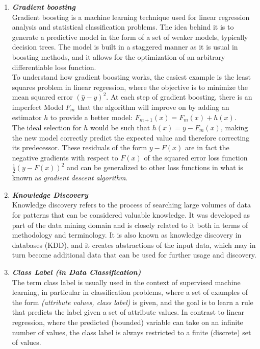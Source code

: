 \documentclass{article}
\begin{document}
\begin{enumerate}[label=(\alph*)]
\begin{enumerate}[label=\textbf{\arabic*.}]
            \item \textbf{\textit{Gradient boosting}}\\
Gradient boosting is a machine learning technique used for linear regression analysis and statistical classification problems. The idea behind it is to generate a predictive model in the form of a set of weaker models, typically decision trees. The model is built in a staggered manner as it is usual in boosting methods, and it allows for the optimization of an arbitrary differentiable loss function.\\
To understand how gradient boosting works, the easiest example is the least squares problem in linear regression, where the objective is to minimize the mean squared error $(\hat{y}-y)^2$. At each step of gradient boosting, there is an imperfect Model $F_m$ that the algorithm will improve on by adding an estimator $h$ to provide a better model: $F_{m+1}(x) = F_m(x) + h(x)$.\\
The ideal selection for $h$ would be such that $h(x) = y - F_m(x)$, making the new model correctly predict the expected value and therefore correcting its predecessor. These residuals of the form $y-F(x)$ are in fact the negative gradients with respect to $F(x)$ of the squared error loss function $\frac{1}{2}(y-F(x))^2$ and can be generalized to other loss functions in what is known as \emph{gradient descent algorithm}. 
            
            \item \textbf{\textit{Knowledge Discovery}}\\
Knowledge discovery refers to the process of  searching large volumes of data for patterns that can be considered valuable knowledge. It was developed as part of the data mining domain and is closely related to it both in terms of methodology and terminology. It is also known as knowledge discovery in databases (KDD), and it creates abstractions of the input data, which may in turn become additional data that can be used for further usage and discovery.
            
            \item \textbf{\textit{Class Label (in Data Classification)}}\\
The term class label is usually used in the context of supervised machine learning, in particular in classification problems, where a set of examples of the form \textit{(attribute values, class label)} is given, and the goal is to learn a rule that predicts the label given a set of attribute values. In contrast to linear regression, where the predicted (bounded) variable can take on an infinite number of values, the class label is always restricted to a finite (discrete) set of values.
            

\end{enumerate}
\end{enumerate}
\end{document}
